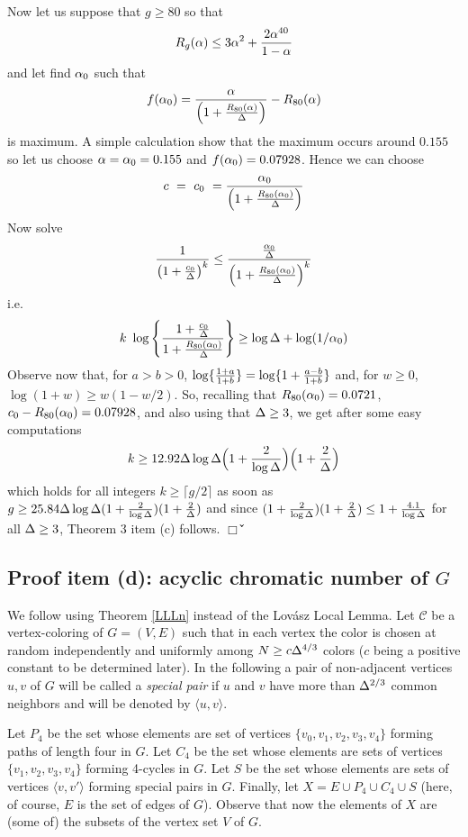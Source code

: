 \documentclass[11pt]{article}
\begin{document}
\\Now let us suppose that $g\ge 80$  so that
$$
R_{g}(\alpha)\le 3\alpha^2+ {2\alpha^{40}\over 1-\alpha}
$$
and let find $\alpha_0$ such that
$$
f(\alpha_0)={\alpha\over \left(1+ {R_{80}(\alpha)\over \Delta}\right)} -R_{80}(\alpha)
$$
is maximum. A simple calculation show that the maximum occurs around 0$.155$ so let us choose $\alpha=\alpha_0= 0.155$ and $f(\alpha_0)= 0.07928$. Hence we can choose
$$
c~= ~c_0~={\alpha_0\over \left(1+ {R_{80}(\alpha_0)\over \Delta}\right)}
$$
Now
solve
$$
{1\over \left(1+{c_0\over \Delta}\right)^k}\le {{\alpha_0\over \Delta}\over \left(1+ {R_{80}(\alpha_0)\over \Delta}\right)^k}
$$
i.e.
$$
k~\log\left\{1+{c_0\over \Delta}\over 1+ {R_{80}(\alpha_0)\over \Delta}\right\}\ge \log\Delta + \log(1/\alpha_0)
$$
Observe now that, for $a>b>0$, $\log\{{1+a\over 1+ b}\}= \log\{1+{a-b\over 1+ b}\}$ and,  for  $w\ge 0$,  $\log(1+w)\ge w(1-w/2)$. So,
recalling that $R_{80}(\alpha_0)=0.0721$, $c_0- R_{80}(\alpha_0)= 0.07928$, and  also using that  $\Delta\ge 3$, we get
after some easy computations
$$
k\ge  12.92\Delta\log\Delta\Big(1+ {2\over \log\Delta}\Big) \Big(1 + {2\over \Delta}\Big)
$$
which holds for all integers $k\ge  \lceil g/2\rceil$ as soon as $g\ge  25.84\Delta\log\Delta(1+ {2\over \log\Delta}) (1 + {2\over \Delta})$  and since
$(1+ {2\over \log\Delta}) (1 + {2\over \Delta}) \le 1+ {4.1\over \log \Delta}$ for all $\Delta\ge 3$, Theorem 3 item (c) follows. $\Box$
\v\v



\subsection{Proof item (d): acyclic chromatic number of $G$}

\def\N{{\mathbb N}}\def\la{\langle}\def\ra{\rangle}
We follow  \cite{AMR} using Theorem \ref{LLLn} instead of the Lov\'asz Local Lemma.
Let  $\mathcal C$ be a  vertex-coloring of $G=(V,E)$  such that in  each vertex
the color is chosen at random independently and uniformly among
$N\ge c\Delta^{4/3}$ colors ($c$ being a positive constant to be determined later).
In the following a pair of non-adjacent vertices $u,v$ of $G$ will be  called a {\it special pair} if
$u$ and $v$ have more than $\Delta^{2/3}$ common neighbors and will be denoted by $\la u,v\ra$.




Let $P_{4}$ be the set whose elements  are  set of vertices  $\{v_0,v_1,v_2,v_3,v_4\}$ forming paths of length four  in $G$. Let $C_4$
be the set whose elements  are  sets of vertices  $\{v_1,v_2,v_3,v_4\}$ forming 4-cycles  in $G$. Let $S$  be the set whose elements  are  sets of vertices  $\la v,v'\ra$ forming special pairs  in $G$.
Finally, let $X= E\cup P_4\cup C_4\cup S$ (here, of course, $E$ is the set of edges of $G$). Observe that
now the elements of $X$ are (some of) the subsets of  the vertex set $V$ of $G$.
\end{document}
